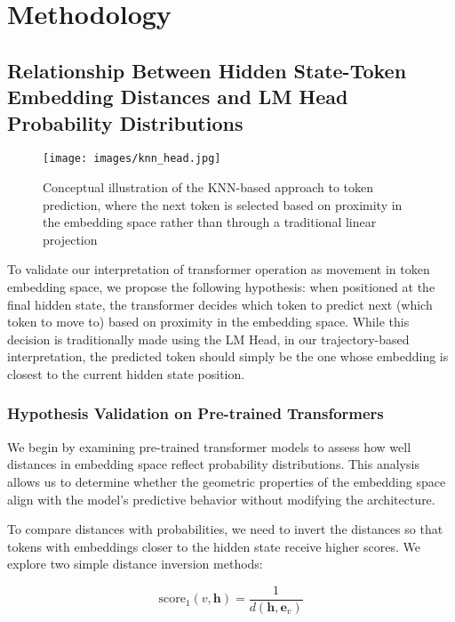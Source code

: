 \chapter{Methodology}

\section{Relationship Between Hidden State-Token Embedding Distances and LM Head Probability Distributions}

\begin{figure}[h]
    \centering
    \texttt{[image: images/knn\_head.jpg]}
    \caption{Conceptual illustration of the KNN-based approach to token prediction, where the next token is selected based on proximity in the embedding space rather than through a traditional linear projection}
    \label{fig:knn_head}
\end{figure}

To validate our interpretation of transformer operation as movement in token embedding space, we propose the following hypothesis: when positioned at the final hidden state, the transformer decides which token to predict next (which token to move to) based on proximity in the embedding space. While this decision is traditionally made using the LM Head, in our trajectory-based interpretation, the predicted token should simply be the one whose embedding is closest to the current hidden state position.

\subsection{Hypothesis Validation on Pre-trained Transformers}

We begin by examining pre-trained transformer models to assess how well distances in embedding space reflect probability distributions. This analysis allows us to determine whether the geometric properties of the embedding space align with the model's predictive behavior without modifying the architecture.

To compare distances with probabilities, we need to invert the distances so that tokens with embeddings closer to the hidden state receive higher scores. We explore two simple distance inversion methods:

\begin{equation}
    \text{score}_1(v, \mathbf{h}) = \frac{1}{d(\mathbf{h}, \mathbf{e}_v)}
    \label{eq::inverse_distance}
\end{equation}

